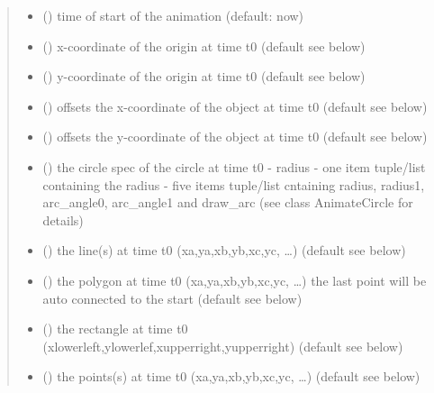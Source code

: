 \documentclass[letterpaper,10pt,english]{sphinxmanual}
\begin{document}
\begin{fulllineitems}
\begin{fulllineitems}
\begin{quote}
\begin{description}
\begin{itemize}
\item {} 
 () \textendash{} time of start of the animation (default: now)

\item {} 
 () \textendash{} x-coordinate of the origin at time t0 (default see below)

\item {} 
 () \textendash{} y-coordinate of the origin at time t0 (default see below)

\item {} 
 () \textendash{} offsets the x-coordinate of the object at time t0 (default see below)

\item {} 
 () \textendash{} offsets the y-coordinate of the object at time t0 (default see below)

\item {} 
 () \textendash{} the circle spec of the circle at time t0 
- radius 
- one item tuple/list containing the radius 
- five items tuple/list cntaining radius, radius1, arc\_angle0, arc\_angle1 and draw\_arc
(see class AnimateCircle for details)

\item {} 
 () \textendash{} the line(s) at time t0 (xa,ya,xb,yb,xc,yc, …) (default see below)

\item {} 
 () \textendash{} the polygon at time t0 (xa,ya,xb,yb,xc,yc, …) 
the last point will be auto connected to the start (default see below)

\item {} 
 () \textendash{} the rectangle at time t0 
(xlowerleft,ylowerlef,xupperright,yupperright) (default see below)

\item {} 
 () \textendash{} the points(s) at time t0 (xa,ya,xb,yb,xc,yc, …) (default see below)


\end{itemize}
\end{description}
\end{quote}
\end{fulllineitems}
\end{fulllineitems}
\end{document}
